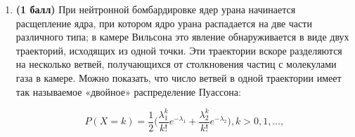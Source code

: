 \documentclass{assignment}
\begin{document}

\begin{enumerate}
    \item \textbf{(1 балл)}  При нейтронной бомбардировке ядер урана начинается расщепление ядра, при котором ядро урана распадается на две части различного типа; в камере Вильсона это явление обнаруживается в виде двух траекторий, исходящих из одной точки. Эти траектории вскоре разделяются на несколько ветвей, получающихся от столкновения частиц с молекулами газа в камере. Можно показать, что число ветвей в одной траектории имеет так называемое «двойное» распределение Пуассона:

    $$P(X = k) = \frac{1}{2}\Big(\frac{\lambda_1^k}{k!}e^{-\lambda_1} + \frac{\lambda_2^k}{k!}e^{-\lambda_2} \Big), k > 0, 1, \ldots,$$


\end{enumerate}
\end{document}
